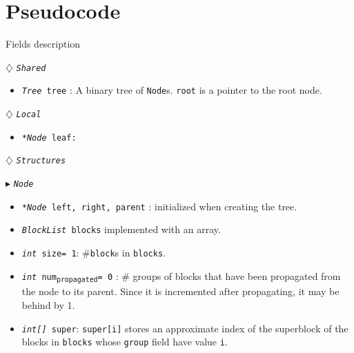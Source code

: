 \documentclass[10pt]{article}
\newcommand{\sub}[1]{\textsubscript{#1}}
\renewcommand{\tt}[1]{\texttt{#1}}
\renewcommand{\sl}[1]{\textsl{#1}}
\renewcommand{\bf}[1]{\textbf{#1}}
\theoremstyle{definition}
\begin{document}
\section{Pseudocode}

\begin{algorithm}
\caption{Fields description}
\begin{algorithmic}[1]
\setcounter{ALG@line}{100}
\begin{multicols}{2}


\Statex $\diamondsuit$ \tt{\sl{Shared}}
\begin{itemize}
\item \tt{\sl{Tree} tree} \textsf{: A binary tree of \tt{Node}s. \tt{root} is a pointer to the root node.}
\end{itemize}

\Statex

\Statex $\diamondsuit$ \tt{\sl{Local}}
\begin{itemize}
\item \tt{\sl{*Node} leaf:} 
\end{itemize}

\Statex
\Statex $\diamondsuit$ \tt{\sl{Structures}}

\Statex $\blacktriangleright$ \tt{\sl{Node}}
\begin{itemize}
\item \tt{\sl{*Node} left, right, parent} \textsf{: initialized  when creating the tree.}
\item \tt{\sl{BlockList} blocks}
  \textsf{ implemented with an array.}
\item \tt{\sl{int} size= 1}\textsf{: \#\tt{block}s in \tt{blocks}.}
\item \tt{\sl{int} num\sub{propagated}= 0}\textsf{} \textsf{: \# groups of blocks that have been propagated from the node to its parent. Since it is incremented after propagating, it may be behind by 1.}
\item \tt{\sl{int[]} super}\textsf{: \tt{super[i]} stores an approximate index of the superblock of the blocks in \tt{blocks} whose \tt{group} field have value \tt{i}.}
\end{itemize}

%  
%
%  


\end{multicols}
\end{algorithmic}
\end{algorithm}
\end{document}
